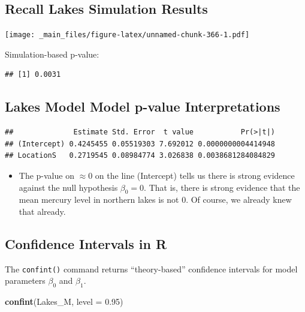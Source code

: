 \documentclass[]{book}
\newenvironment{Shaded}{\begin{snugshade}}{\end{snugshade}}
\newcommand{\KeywordTok}[1]{\textcolor[rgb]{0.13,0.29,0.53}{\textbf{#1}}}
\newcommand{\DataTypeTok}[1]{\textcolor[rgb]{0.13,0.29,0.53}{#1}}
\newcommand{\FloatTok}[1]{\textcolor[rgb]{0.00,0.00,0.81}{#1}}
\newcommand{\OperatorTok}[1]{\textcolor[rgb]{0.81,0.36,0.00}{\textbf{#1}}}
\newcommand{\NormalTok}[1]{#1}
\providecommand{\tightlist}{%
  \setlength{\itemsep}{0pt}\setlength{\parskip}{0pt}}
\begin{document}
\subsection{Recall Lakes Simulation
Results}\label{recall-lakes-simulation-results}

\texttt{[image: \_main\_files/figure-latex/unnamed-chunk-366-1.pdf]}

Simulation-based p-value:

\begin{verbatim}
## [1] 0.0031
\end{verbatim}

\subsection{Lakes Model Model p-value
Interpretations}\label{lakes-model-model-p-value-interpretations-1}

\begin{Shaded}
\end{Shaded}

\begin{verbatim}
##              Estimate Std. Error  t value           Pr(>|t|)
## (Intercept) 0.4245455 0.05519303 7.692012 0.0000000004414948
## LocationS   0.2719545 0.08984774 3.026838 0.0038681284084829
\end{verbatim}

\begin{itemize}
\tightlist
\item
  The p-value on \(\approx 0\) on the line (Intercept) tells us there is
  strong evidence against the null hypothesis \(\beta_0=0\). That is,
  there is strong evidence that the mean mercury level in northern lakes
  is not 0. Of course, we already knew that already.
\end{itemize}

\subsection{Confidence Intervals in R}\label{confidence-intervals-in-r}

The \texttt{confint()} command returns ``theory-based'' confidence
intervals for model parameters \(\beta_0\) and \(\beta_1\).

\begin{Shaded}
\begin{Highlighting}[]
\KeywordTok{confint}\NormalTok{(Lakes_M, }\DataTypeTok{level =} \FloatTok{0.95}\NormalTok{)}
\end{Highlighting}
\end{Shaded}
\end{document}
